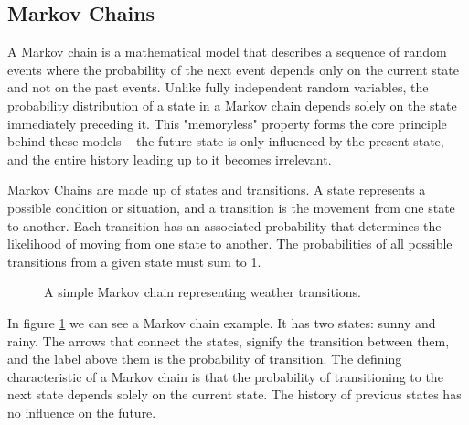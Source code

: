 \subsection{Markov Chains}
\label{appendix:markov_chains}

A Markov chain is a mathematical model that describes a sequence of random events where the probability of the next event depends only on the current state and not on the past events. Unlike fully independent random variables, the probability distribution of a state in a Markov chain depends solely on the state immediately preceding it. This "memoryless" property forms the core principle behind these models – the future state is only influenced by the present state, and the entire history leading up to it becomes irrelevant.

Markov Chains are made up of states and transitions. A state represents a possible condition or situation, and a transition is the movement from one state to another. Each transition has an associated probability that determines the likelihood of moving from one state to another. The probabilities of all possible transitions from a given state must sum to 1.

\begin{figure}
  \centering
  \caption{A simple Markov chain representing weather transitions.}
  \label{fig:markov_chain}
\end{figure}

In figure \ref{fig:markov_chain} we can see a Markov chain example. It has two states: sunny and rainy. The arrows that connect the states, signify the transition between them, and the label above them is the probability of transition. The defining characteristic of a Markov chain is that the probability of transitioning to the next state depends solely on the current state. The history of previous states has no influence on the future. 